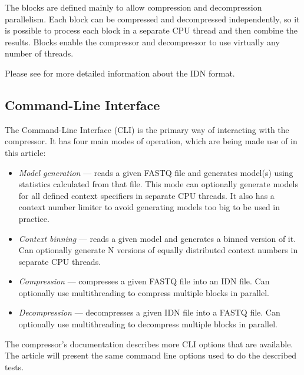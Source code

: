 The blocks are defined mainly to allow compression and decompression
parallelism.
Each block can be compressed and decompressed independently, so it is
possible to process each block in a separate CPU thread and then combine the
results.
Blocks enable the compressor and decompressor to use virtually any number of
threads.

Please see  for more detailed information about the
IDN format.

\subsection{Command-Line Interface}\label{subsec:command-line-interface}

The Command-Line Interface (CLI) is the primary way of interacting with the
compressor.
It has four main modes of operation, which are being made use of in this
article:

\begin{itemize}
    \item \emph{Model generation} --- reads a given FASTQ file and generates model(s)
    using statistics calculated from that file.
    This mode can optionally generate models for all defined context specifiers
    in separate CPU threads.
    It also has a context number limiter to avoid generating models too big to
    be used in practice.
    \item \emph{Context binning} --- reads a given model and generates a binned
    version of it.
    Can optionally generate N versions of equally distributed context numbers in
    separate CPU threads.
    \item \emph{Compression} --- compresses a given FASTQ file into an IDN file.
    Can optionally use multithreading to compress multiple blocks in parallel.
    \item \emph{Decompression} --- decompresses a given IDN file into a FASTQ file.
    Can optionally use multithreading to decompress multiple blocks in parallel.
\end{itemize}

The compressor’s documentation describes more CLI options that are available.
The article will present the same command line options used to do the
described tests.
